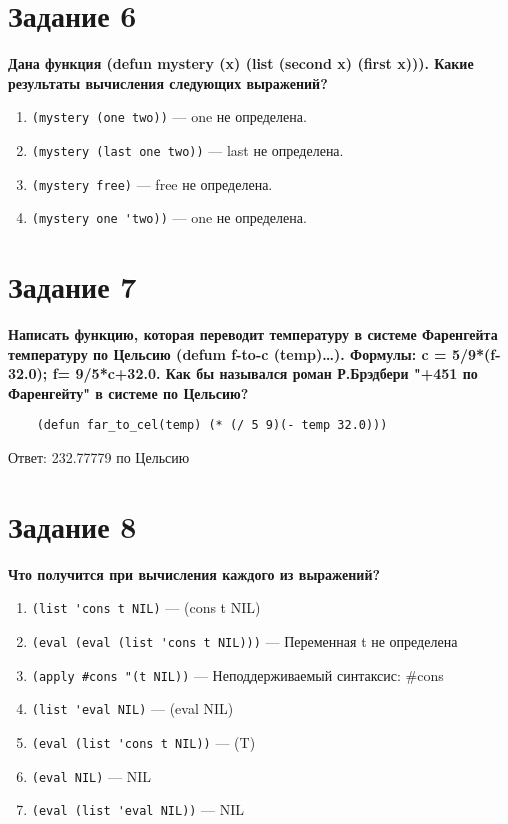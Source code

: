 \documentclass[a4paper,14pt, unknownkeysallowed]{extreport}
\begin{document}
\section*{Задание 6}

\textbf{Дана функция (defun mystery (x) (list (second x) (first x))).
	Какие результаты вычисления следующих выражений? }


\begin{enumerate}[label=\arabic*)]
	\item \lstinline {(mystery (one two))} --- one не определена.
	\item \lstinline {(mystery (last one two))} --- last не определена.
	\item \lstinline {(mystery free)} --- free не определена.
	\item \lstinline {(mystery one 'two))} --- one не определена.
\end{enumerate}

\section*{Задание 7}

\textbf{Написать функцию, которая переводит температуру в системе Фаренгейта
	температуру по Цельсию (defum f-to-c (temp)…).
	Формулы: 	c = 5/9*(f-32.0); 	f= 9/5*c+32.0. 
	Как бы назывался роман Р.Брэдбери "+451 по Фаренгейту" в системе по Цельсию?}

\begin{lstlisting}
	(defun far_to_cel(temp) (* (/ 5 9)(- temp 32.0)))
\end{lstlisting}

Ответ: 232.77779 по Цельсию

\section*{Задание 8}

\textbf{Что получится при вычисления каждого из выражений?}


\begin{enumerate}[label=\arabic*)]
	\item \lstinline {(list 'cons t NIL)} --- (cons t NIL)
	\item \lstinline {(eval (eval (list 'cons t NIL)))} --- Переменная t не определена
	\item \lstinline {(apply #cons "(t NIL))} --- Неподдерживаемый синтаксис: \#cons
	\item \lstinline {(list 'eval NIL)} --- (eval NIL)
	\item \lstinline {(eval (list 'cons t NIL))} --- (T)
	\item \lstinline {(eval NIL)} --- NIL
	\item \lstinline {(eval (list 'eval NIL))} --- NIL
	
	
\end{enumerate}
\end{document}
